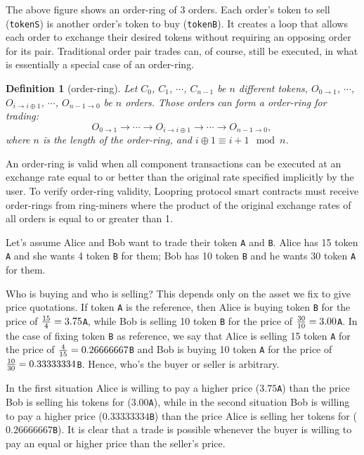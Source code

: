 \documentclass[UTF8,nofonts]{article}
\newtheorem{definition}{Definition}[section]
\begin{document}
\begin{multicols}{2}
The above figure shows an order-ring of 3 orders. Each order's token to sell (\verb|tokenS|) is another order's token to buy (\verb|tokenB|). It creates a loop that allows each order to exchange their desired tokens without requiring an opposing order for its pair. Traditional order pair trades can, of course, still be executed, in what is essentially a special case of an order-ring. 

\begin{definition}[order-ring] Let $C_{0}$, $C_{1}$, $\cdots$, $C_{n-1}$ be $n$ different tokens, $O_{0\rightarrow 1}$, $\cdots$, $O_{i\rightarrow i\oplus 1}$, $\cdots$, $O_{n-1 \rightarrow 0}$ be $n$ orders. Those orders can form a order-ring for trading:
$$O_{0\rightarrow 1} \rightarrow \cdots \rightarrow O_{i\rightarrow i\oplus 1} \rightarrow \cdots \rightarrow O_{n-1\rightarrow 0} \text{, }$$
where $n$ is the length of the order-ring, and $i\oplus 1 \equiv i+1 \mod n$.
\end{definition}

An order-ring is valid when all component transactions can be executed at an exchange rate equal to or better than the original rate specified implicitly by the user. To verify order-ring validity, Loopring protocol smart contracts must receive order-rings from ring-miners where the product of the original exchange rates of all orders is equal to or greater than 1.

Let's assume Alice and Bob want to trade their token \verb|A| and \verb|B|. Alice has 15 token \verb|A| and she wants 4 token \verb|B| for them; Bob has 10 token \verb|B|  and he wants 30 token \verb|A| for them.

Who is buying and who is selling? This depends only on the asset we fix to give price quotations. If token \verb|A| is the reference, then Alice is buying token \verb|B| for the price of ${15 \over 4} = 3.75$\verb|A|, while Bob is selling 10 token \verb|B| for the price of ${30 \over 10} = 3.00$\verb|A|. In the case of fixing token \verb|B| as reference, we say that Alice is selling 15 token \verb|A| for the price of ${4\over 15}=0.26666667$\verb|B| and Bob is buying 10 token \verb|A| for the price of ${10 \over 30}=0.33333334$\verb|B|. Hence, who's the buyer or seller is arbitrary.

In the first situation Alice is willing to pay a higher price ($3.75$\verb|A|) than the price Bob is selling his tokens for ($3.00$\verb|A|), while in the second situation Bob is willing to pay a higher price ($0.33333334$\verb|B|) than the price Alice is selling her tokens for ($0.26666667$\verb|B|). It is clear that a trade is possible whenever the buyer is willing to pay an equal or higher price than the seller's price.


\end{multicols}
\end{document}
